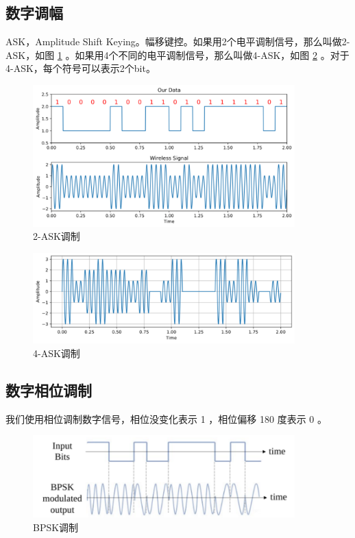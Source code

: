 \documentclass[lang=cn,newtx,10pt,scheme=chinese]{elegantbook}
\begin{document}
\subsection{数字调幅}

ASK，Amplitude Shift Keying。幅移键控。如果用2个电平调制信号，那么叫做2-ASK，如图 \ref{fig:2-ASK} 。如果用4个不同的电平调制信号，那么叫做4-ASK，如图 \ref{fig:4-ASK} 。对于 4-ASK，每个符号可以表示2个bit。

\begin{figure}[!htb]
\centering
\includegraphics[width=0.9\textwidth]{ASK.pdf}
\caption{2-ASK调制}
\label{fig:2-ASK}
\end{figure}

\begin{figure}[!htb]
\centering
\includegraphics[width=0.9\textwidth]{ask2.pdf}
\caption{4-ASK调制}
\label{fig:4-ASK}
\end{figure}

\subsection{数字相位调制}

我们使用相位调制数字信号，相位没变化表示 1 ，相位偏移 180 度表示 0 。

\begin{figure}[!htb]
\centering
\includegraphics[width=0.9\textwidth]{bpsk.pdf}
\caption{BPSK调制}
\label{fig:BPSK}
\end{figure}
\end{document}
